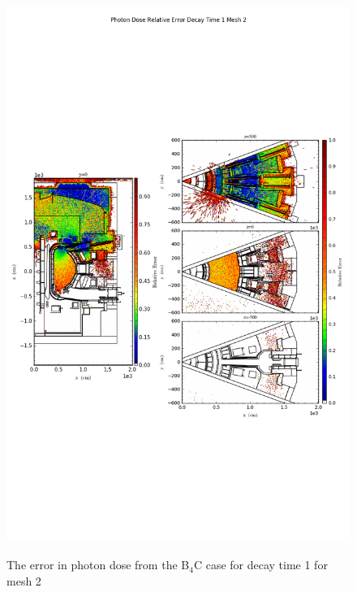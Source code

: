 \begin{figure}[ht!]
\centering
\includegraphics[trim={0cm 9cm 0cm 10cm},clip,scale=0.75]{../plots/final_model_nob4c/Photon_Dose_Relative_Error_Decay_Time_1_Mesh_2.png}
\label{fig:photons_dc1_no4bc_m2_error}
\caption{The error in photon dose from the B$_4$C case for decay time 1 for mesh 2}
\end{figure}
